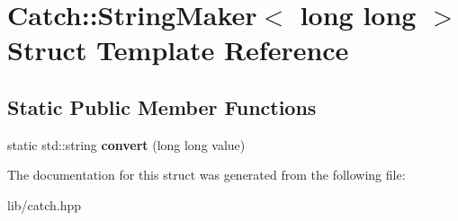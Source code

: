 \hypertarget{struct_catch_1_1_string_maker_3_01long_01long_01_4}{}\section{Catch\+:\+:String\+Maker$<$ long long $>$ Struct Template Reference}
\label{struct_catch_1_1_string_maker_3_01long_01long_01_4}
\subsection*{Static Public Member Functions}
\begin{DoxyCompactItemize}
\item 
\mbox{\label{struct_catch_1_1_string_maker_3_01long_01long_01_4_a7a58929dca2a14c576d7d6d08bc615d2}} 
static std\+::string {\bfseries convert} (long long value)
\end{DoxyCompactItemize}


The documentation for this struct was generated from the following file\+:\begin{DoxyCompactItemize}
\item 
lib/catch.\+hpp\end{DoxyCompactItemize}
